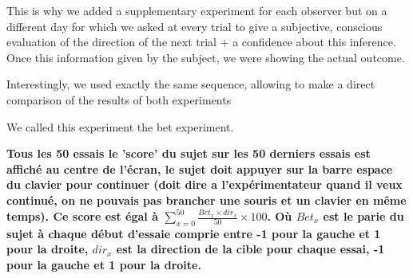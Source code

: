 \documentclass[profile,final,english,draft]{article}%
\begin{document}


This is why we added a supplementary experiment for each observer but on a different day for which we asked at every trial to give a subjective, conscious evaluation of the direction of the next trial + a confidence about this inference. Once this information given by the subject, we were showing the actual outcome.

Interestingly, we used exactly the same sequence, allowing to make a direct comparison of the results of both experiments

We called this experiment the bet experiment.


\textbf{Tous les 50 essais le 'score' du sujet sur les 50 derniers essais est affiché au centre de l'écran, le sujet doit appuyer sur la barre espace du clavier pour continuer (doit dire a l'expérimentateur quand il veux continué, on ne pouvais pas brancher une souris et un clavier en même temps). Ce score est égal à $\sum_{x=0}^{50} \frac{Bet_{x} \times dir_x}{50} \times 100$. Où $Bet_x$ est le parie du sujet à chaque début d'essaie comprie entre -1 pour la gauche et 1 pour la droite, $dir_x$ est la direction de la cible pour chaque essai, -1 pour la gauche et 1 pour la droite.}


\end{document}
